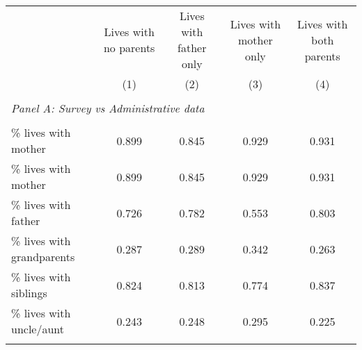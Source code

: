 \makeatletter
{}
{
\makeatother
\begin{tabular}{lcccc}
\toprule
& Lives with no parents & Lives with father only & Lives with mother only &  Lives with both parents \\
\cmidrule(lr){2-2} \cmidrule(lr){3-3} \cmidrule(lr){4-4} \cmidrule(lr){5-5}
& (1) & (2) & (3) & (4)\\
\bottomrule
&  &  &  & \\

\multicolumn{4}{l}{\textit{Panel A: Survey vs Administrative data}} \\
            &            &            &            &            \\
\% lives with mother & 0.899 & 0.845 & 0.929 & 0.931 \\
\% lives with mother & 0.899 & 0.845 & 0.929 & 0.931 \\
\% lives with father & 0.726 & 0.782 & 0.553 & 0.803 \\
\% lives with grandparents & 0.287 & 0.289 & 0.342 & 0.263 \\
\% lives with siblings & 0.824 & 0.813 & 0.774 & 0.837 \\
\% lives with uncle/aunt & 0.243 & 0.248 & 0.295 & 0.225 \\
            &            &            &            &            \\

\bottomrule
\end{tabular}
}
